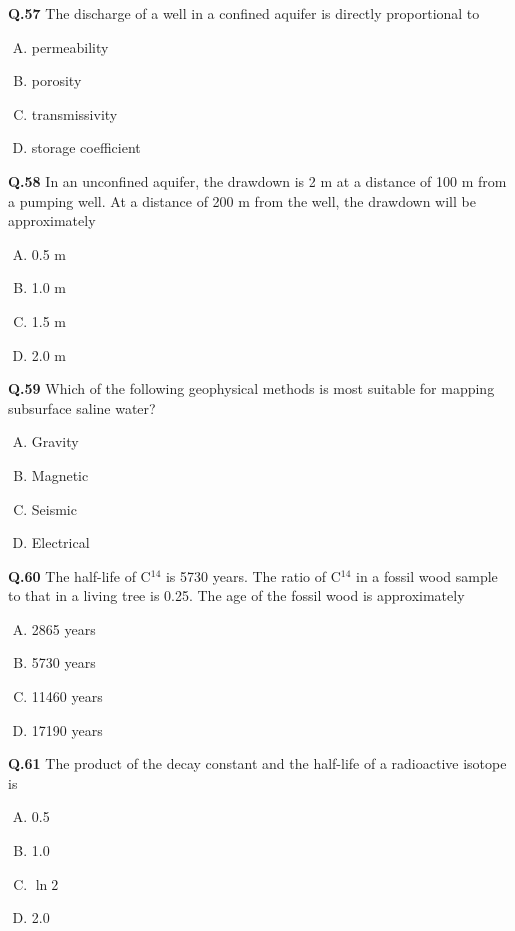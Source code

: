\textbf{Q.57} The discharge of a well in a confined aquifer is directly proportional to
\begin{enumerate}[(A)]
    \item permeability
    \item porosity
    \item transmissivity
    \item storage coefficient
\end{enumerate}

\textbf{Q.58} In an unconfined aquifer, the drawdown is 2 m at a distance of 100 m from a pumping well. At a distance of 200 m from the well, the drawdown will be approximately
\begin{multicols}{4}
    

\begin{enumerate}[(A)]
    \item 0.5 m
    \item 1.0 m
    \item 1.5 m
    \item 2.0 m
\end{enumerate}
\end{multicols}
\textbf{Q.59} Which of the following geophysical methods is most suitable for mapping subsurface saline water?
\begin{enumerate}[(A)]
    \item Gravity
    \item Magnetic
    \item Seismic
    \item Electrical
\end{enumerate}

\textbf{Q.60} The half-life of C$^{14}$ is 5730 years. The ratio of C$^{14}$ in a fossil wood sample to that in a living tree is 0.25. The age of the fossil wood is approximately
\begin{enumerate}[(A)]
    \item 2865 years
    \item 5730 years
    \item 11460 years
    \item 17190 years
\end{enumerate}

\textbf{Q.61} The product of the decay constant and the half-life of a radioactive isotope is
\begin{multicols}{4}
    

\begin{enumerate}[(A)]
    \item 0.5
    \item 1.0
    \item $\ln 2$
    \item 2.0
\end{enumerate}
\end{multicols}

